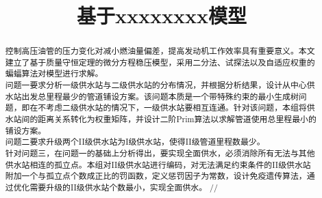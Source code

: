 \documentclass{whutmod}
\title{基于xxxxxxxx模型}
\begin{document}
	\maketitle
	\thispagestyle{empty}
	\begin{abstract}
		控制高压油管的压力变化对减小燃油量偏差，提高发动机工作效率具有重要意义。本文建立了基于质量守恒定理的微分方程稳压模型，采用二分法、试探法以及自适应权重的蝙蝠算法对模型进行求解。
		\\
	
	    问题一要求分析一级供水站与二级供水站的分布情况，并根据分析结果，设计从中心供水站出发总里程最少的管道铺设方案。该问题本质是一个带特殊约束的最小生成树问题，即在不考虑二级供水站的情况下，一级供水站要相互连通。针对该问题，本组将供水站间的距离关系转化为权重矩阵，并设计二阶Prim算法以求解管道使用总里程最小的铺设方案。
		\\
		
		问题二要求升级两个II级供水站为I级供水站，使得II级管道里程数最少。
		\\
		
		针对问题三，在问题一的基础上分析得出，要实现全面供水，必须消除所有无法与其他供水站相连的孤立点。本组对II级供水站进行编码，对无法满足约束条件的II级供水站附加一个与孤立点个数成正比的罚函数，定义惩罚因子为常数，设计免疫遗传算法，通过优化需要升级的II级供水站个数最小，实现全面供水。
		//
	

\end{abstract}
\end{document}
